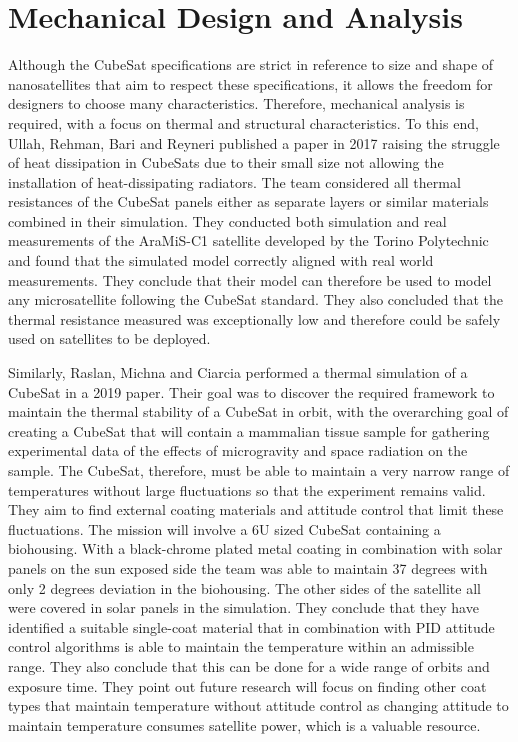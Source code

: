 \section{Mechanical Design and Analysis}
Although the CubeSat specifications are strict in reference to size and shape of nanosatellites that aim to respect these specifications, it allows the freedom for designers to choose many characteristics. 
Therefore, mechanical analysis is required, with a focus on thermal and structural characteristics. 
To this end, Ullah, Rehman, Bari and Reyneri published a paper in 2017 raising the struggle of heat dissipation in CubeSats due to their small size not allowing the installation of heat-dissipating radiators. 
The team considered all thermal resistances of the CubeSat panels either as separate layers or similar materials combined in their simulation. 
They conducted both simulation and real measurements of the AraMiS-C1 satellite developed by the Torino Polytechnic and found that the simulated model correctly aligned with real world measurements. 
They conclude that their model can therefore be used to model any microsatellite following the CubeSat standard. 
They also concluded that the thermal resistance measured was exceptionally low and therefore could be safely used on satellites to be deployed\cite{RefWorks:ali2017thermal}.

Similarly, Raslan, Michna and Ciarcia performed a thermal simulation of a CubeSat in a 2019 paper. 
Their goal was to discover the required framework to maintain the thermal stability of a CubeSat in orbit, with the overarching goal of creating a CubeSat that will contain a mammalian tissue sample for gathering experimental data of the effects of microgravity and space radiation on the sample. 
The CubeSat, therefore, must be able to maintain a very narrow range of temperatures without large fluctuations so that the experiment remains valid. 
They aim to find external coating materials and attitude control that limit these fluctuations. 
The mission will involve a 6U sized CubeSat containing a biohousing. 
With a black-chrome plated metal coating in combination with solar panels on the sun exposed side the team was able to maintain 37 degrees with only 2 degrees deviation in the biohousing. 
The other sides of the satellite all were covered in solar panels in the simulation. 
They conclude that they have identified a suitable single-coat material that in combination with PID attitude control algorithms is able to maintain the temperature within an admissible range. 
They also conclude that this can be done for a wide range of orbits and exposure time. 
They point out future research will focus on finding other coat types that maintain temperature without attitude control as changing attitude to maintain temperature consumes satellite power, which is a valuable resource\cite{RefWorks:raslanthermal}.


